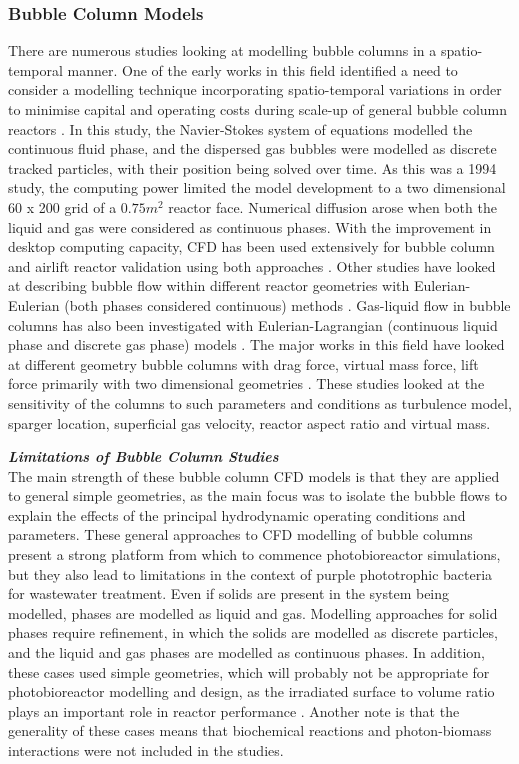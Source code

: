 \subsubsection{Bubble Column Models}
There are numerous studies looking at modelling bubble columns in a spatio-temporal manner. One of the early works in this field identified a need to consider a modelling technique incorporating spatio-temporal variations in order to minimise capital and operating costs during scale-up of general bubble column reactors \cite{Lapin1994}. In this study, the Navier-Stokes system of equations modelled the continuous fluid phase, and the dispersed gas bubbles were modelled as discrete tracked particles, with their position being solved over time. As this was a 1994 study, the computing power limited the model development to a two dimensional 60 x 200 grid of a $0.75 m^{2}$ reactor face. Numerical diffusion arose when both the liquid and gas were considered as continuous phases. With the improvement in desktop computing capacity, CFD has been used extensively for bubble column and airlift reactor validation using both approaches \cite{Bitog2011}. Other studies have looked at describing bubble flow within different reactor geometries with Eulerian-Eulerian (both phases considered continuous) methods \cite{Lehr2002, Pfleger2001, Buwa2002, Pareek2003, Ekambara2005, Sokolichin1999}. Gas-liquid flow in bubble columns has also been investigated with Eulerian-Lagrangian (continuous liquid phase and discrete gas phase) models \cite{Zhang2013a}. The major works in this field have looked at different geometry bubble columns with drag force, virtual mass force, lift force primarily with two dimensional geometries \cite{Buwa2006, Goz2004a, Luo2011, Ekambara2005, Lan2002, Mouza2004}. These studies looked at the sensitivity of the columns to such parameters and conditions as turbulence model, sparger location, superficial gas velocity, reactor aspect ratio and virtual mass.
\skippingparagraph

\textbf{\textit{Limitations of Bubble Column Studies}} \\
The main strength of these bubble column CFD models is that they are applied to general simple geometries, as the main focus was to isolate the bubble flows to explain the effects of the principal hydrodynamic operating conditions and parameters. These general approaches to CFD modelling of bubble columns present a strong platform from which to commence photobioreactor simulations, but they also lead to limitations in the context of purple phototrophic bacteria for wastewater treatment. Even if solids are present in the system being modelled, phases are modelled as liquid and gas. Modelling approaches for solid phases require refinement, in which the solids are modelled as discrete particles, and the liquid and gas phases are modelled as continuous phases. In addition, these cases used simple geometries, which will probably not be appropriate for photobioreactor modelling and design, as the irradiated surface to volume ratio plays an important role in reactor performance \cite{Soman2015}. Another note is that the generality of these cases means that biochemical reactions and photon-biomass interactions were not included in the studies. 
\skippingparagraph


